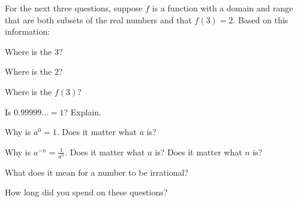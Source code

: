 \documentclass{ximera}
\begin{document}
For the next three questions, suppose $f$ is a function with a domain and range that are both subsets of the real numbers and that $f(3)=2$.  Based on this information:  
\begin{question}
Where is the $3$? 
\begin{freeResponse}
\end{freeResponse}
\end{question}

\begin{question}
Where is the $2$?
\begin{freeResponse}
\end{freeResponse}
\end{question}

\begin{question}
Where is the $f(3)$? 
\begin{freeResponse}
\end{freeResponse}
\end{question}

\begin{question}
Is $0.99999\dots = 1$?  Explain.    
\begin{freeResponse}
\end{freeResponse}
\end{question}

\begin{question}
Why is $a^0 = 1$.  Does it matter what $a$ is?  
\begin{freeResponse}
\end{freeResponse}
\end{question}

\begin{question}
Why is $a^{-n} = \frac{1}{a^n}$.  Does it matter what $a$ is?  Does it matter what $n$ is?  
\begin{freeResponse}
\end{freeResponse}
\end{question}

\begin{question}
What does it mean for a number to be irrational?    
\begin{freeResponse}
\end{freeResponse}
\end{question}

\begin{question}
How long did you spend on these questions?  
\begin{freeResponse}
\end{freeResponse}
\end{question}
\end{document}
